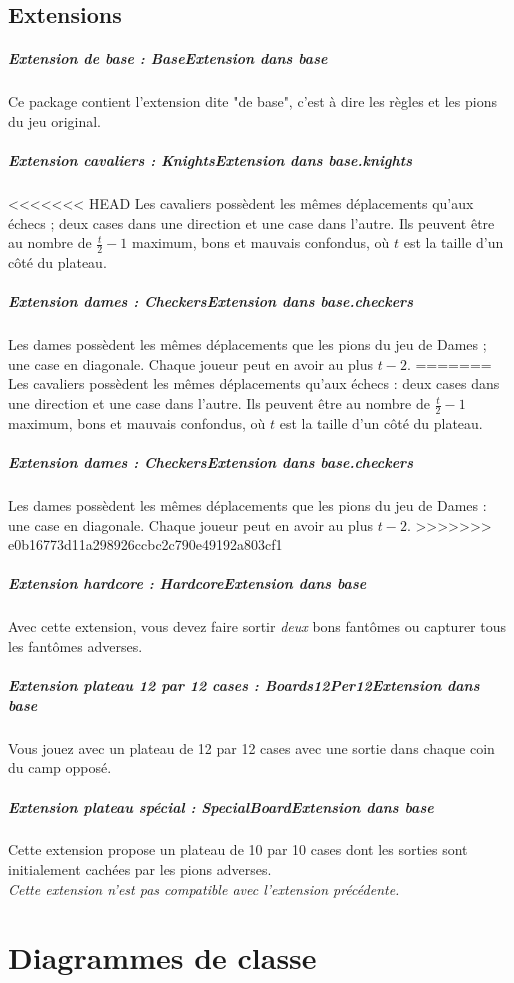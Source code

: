 \documentclass[]{report}
\begin{document}
\subsection{Extensions}
\subparagraph{Extension de base : \textit{BaseExtension} dans \textit{base}}
Ce package contient l'extension dite "de base", c'est à dire les règles et les pions du jeu original.

\subparagraph{Extension cavaliers : \textit{KnightsExtension} dans \textit{base.knights}}
<<<<<<< HEAD
Les cavaliers possèdent les mêmes déplacements qu'aux échecs ; deux cases dans une direction et une case dans l'autre. Ils peuvent être au nombre de $\frac{t}{2}-1$ maximum, bons et mauvais confondus, où $t$ est la taille d'un côté du plateau.

\subparagraph{Extension dames : \textit{CheckersExtension} dans \textit{base.checkers}}
Les dames possèdent les mêmes déplacements que les pions du jeu de Dames ; une case en diagonale. Chaque joueur peut en avoir au plus $t - 2$.
=======
Les cavaliers possèdent les mêmes déplacements qu'aux échecs : deux cases dans une direction et une case dans l'autre. Ils peuvent être au nombre de $\frac{t}{2}-1$ maximum, bons et mauvais confondus, où $t$ est la taille d'un côté du plateau.

\subparagraph{Extension dames : \textit{CheckersExtension} dans \textit{base.checkers}}
Les dames possèdent les mêmes déplacements que les pions du jeu de Dames : une case en diagonale. Chaque joueur peut en avoir au plus $t - 2$.
>>>>>>> e0b16773d11a298926ccbc2c790e49192a803cf1

\subparagraph{Extension hardcore : \textit{HardcoreExtension} dans \textit{base}}
Avec cette extension, vous devez faire sortir \emph{deux} bons fantômes ou capturer tous les fantômes adverses.

\subparagraph{Extension plateau 12 par 12 cases : \textit{Boards12Per12Extension} dans \textit{base}}
Vous jouez avec un plateau de 12 par 12 cases avec une sortie dans chaque coin du camp opposé.

\subparagraph{Extension plateau spécial : \textit{SpecialBoardExtension} dans \textit{base}}
Cette extension propose un plateau de 10 par 10 cases dont les sorties sont initialement cachées par les pions adverses.\\
\emph{Cette extension n'est pas compatible avec l'extension précédente.}

\section{Diagrammes de classe}
\end{document}
